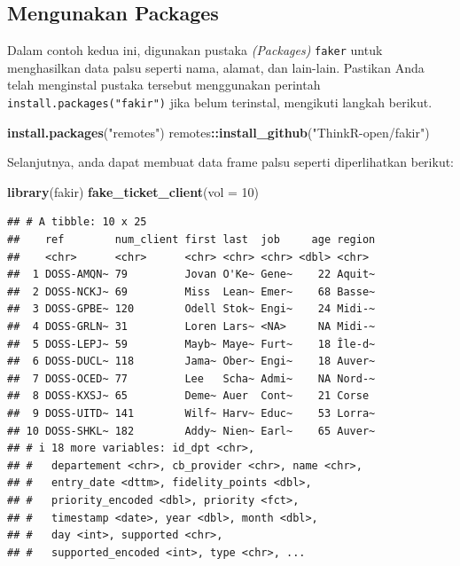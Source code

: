 \documentclass[
]{book}
\newenvironment{Shaded}{\begin{snugshade}}{\end{snugshade}}
\newcommand{\AttributeTok}[1]{\textcolor[rgb]{0.13,0.29,0.53}{#1}}
\newcommand{\DecValTok}[1]{\textcolor[rgb]{0.00,0.00,0.81}{#1}}
\newcommand{\FunctionTok}[1]{\textcolor[rgb]{0.13,0.29,0.53}{\textbf{#1}}}
\newcommand{\NormalTok}[1]{#1}
\newcommand{\SpecialCharTok}[1]{\textcolor[rgb]{0.81,0.36,0.00}{\textbf{#1}}}
\newcommand{\StringTok}[1]{\textcolor[rgb]{0.31,0.60,0.02}{#1}}
\begin{document}
\hypertarget{mengunakan-packages}{%
\subsection{Mengunakan Packages}\label{mengunakan-packages}}

Dalam contoh kedua ini, digunakan pustaka \emph{(Packages)} \texttt{faker} untuk menghasilkan data palsu seperti nama, alamat, dan lain-lain. Pastikan Anda telah menginstal pustaka tersebut menggunakan perintah \texttt{install.packages("fakir")} jika belum terinstal, mengikuti langkah berikut.

\begin{Shaded}
\begin{Highlighting}[]
\FunctionTok{install.packages}\NormalTok{(}\StringTok{"remotes"}\NormalTok{)}
\NormalTok{remotes}\SpecialCharTok{::}\FunctionTok{install\_github}\NormalTok{(}\StringTok{"ThinkR{-}open/fakir"}\NormalTok{)}
\end{Highlighting}
\end{Shaded}

Selanjutnya, anda dapat membuat data frame palsu seperti diperlihatkan berikut:

\begin{Shaded}
\begin{Highlighting}[]
\FunctionTok{library}\NormalTok{(fakir)}
\FunctionTok{fake\_ticket\_client}\NormalTok{(}\AttributeTok{vol =} \DecValTok{10}\NormalTok{)}
\end{Highlighting}
\end{Shaded}

\begin{verbatim}
## # A tibble: 10 x 25
##    ref        num_client first last  job     age region
##    <chr>      <chr>      <chr> <chr> <chr> <dbl> <chr> 
##  1 DOSS-AMQN~ 79         Jovan O'Ke~ Gene~    22 Aquit~
##  2 DOSS-NCKJ~ 69         Miss  Lean~ Emer~    68 Basse~
##  3 DOSS-GPBE~ 120        Odell Stok~ Engi~    24 Midi-~
##  4 DOSS-GRLN~ 31         Loren Lars~ <NA>     NA Midi-~
##  5 DOSS-LEPJ~ 59         Mayb~ Maye~ Furt~    18 Île-d~
##  6 DOSS-DUCL~ 118        Jama~ Ober~ Engi~    18 Auver~
##  7 DOSS-OCED~ 77         Lee   Scha~ Admi~    NA Nord-~
##  8 DOSS-KXSJ~ 65         Deme~ Auer  Cont~    21 Corse 
##  9 DOSS-UITD~ 141        Wilf~ Harv~ Educ~    53 Lorra~
## 10 DOSS-SHKL~ 182        Addy~ Nien~ Earl~    65 Auver~
## # i 18 more variables: id_dpt <chr>,
## #   departement <chr>, cb_provider <chr>, name <chr>,
## #   entry_date <dttm>, fidelity_points <dbl>,
## #   priority_encoded <dbl>, priority <fct>,
## #   timestamp <date>, year <dbl>, month <dbl>,
## #   day <int>, supported <chr>,
## #   supported_encoded <int>, type <chr>, ...
\end{verbatim}
\end{document}
